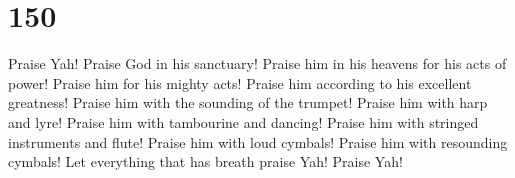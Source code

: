 \hypertarget{section-149}{%
\section{150}\label{section-149}}

 Praise Yah! Praise God in his sanctuary! Praise him in
his heavens for his acts of power!  Praise him for his
mighty acts! Praise him according to his excellent greatness!
 Praise him with the sounding of the trumpet! Praise him
with harp and lyre!  Praise him with tambourine and
dancing! Praise him with stringed instruments and flute! 
Praise him with loud cymbals! Praise him with resounding cymbals!
 Let everything that has breath praise Yah! Praise Yah!
